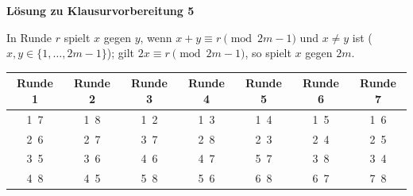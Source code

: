\textbf{Lösung zu Klausurvorbereitung 5}

\begin{loesung}
In Runde $r$ spielt $x$ gegen $y$, wenn $x + y \equiv r \pmod{2m-1}$ und $x \neq y$ ist ($x, y \in \{1, \dots, 2m-1\}$); gilt $2x \equiv r \pmod{2m-1}$, so spielt $x$ gegen $2m$.

\medskip
\begin{tabular}{ccccccc}
\toprule
Runde 1 & Runde 2 & Runde 3 & Runde 4 & Runde 5 & Runde 6 & Runde 7\\
\midrule
1\ 7 & 1\ 8 & 1\ 2 & 1\ 3 & 1\ 4 & 1\ 5 & 1\ 6\\
2\ 6 & 2\ 7 & 3\ 7 & 2\ 8 & 2\ 3 & 2\ 4 & 2\ 5\\
3\ 5 & 3\ 6 & 4\ 6 & 4\ 7 & 5\ 7 & 3\ 8 & 3\ 4\\
4\ 8 & 4\ 5 & 5\ 8 & 5\ 6 & 6\ 8 & 6\ 7 & 7\ 8\\
\bottomrule
\end{tabular}
\end{loesung}
